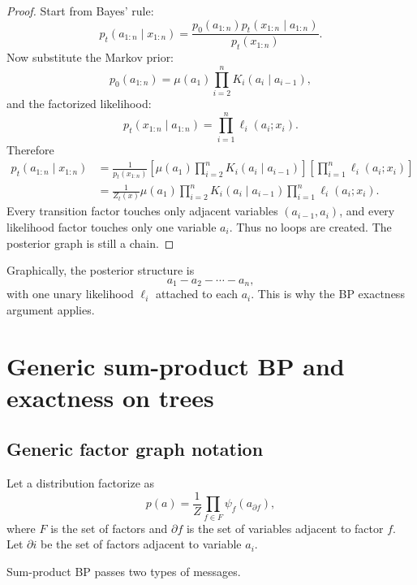 \documentclass[11pt]{article}
\begin{document}
\begin{proof}
Start from Bayes' rule:
\begin{equation}
  p_t(a_{1:n}\mid x_{1:n})
  = \frac{p_0(a_{1:n})p_t(x_{1:n}\mid a_{1:n})}{p_t(x_{1:n})}.
\end{equation}
Now substitute the Markov prior:
\begin{equation}
  p_0(a_{1:n}) = \mu(a_1)\prod_{i=2}^n K_i(a_i\mid a_{i-1}),
\end{equation}
and the factorized likelihood:
\begin{equation}
  p_t(x_{1:n}\mid a_{1:n}) = \prod_{i=1}^n \ell_i(a_i;x_i).
\end{equation}
Therefore
\begin{align}
  p_t(a_{1:n}\mid x_{1:n})
  &= \frac{1}{p_t(x_{1:n})}
  \left[\mu(a_1)\prod_{i=2}^n K_i(a_i\mid a_{i-1})\right]
  \left[\prod_{i=1}^n \ell_i(a_i;x_i)\right] \\
  &= \frac{1}{Z_t(x)}
  \mu(a_1)
  \prod_{i=2}^n K_i(a_i\mid a_{i-1})
  \prod_{i=1}^n \ell_i(a_i;x_i).
\end{align}
Every transition factor touches only adjacent variables \((a_{i-1},a_i)\), and every likelihood factor touches only one variable \(a_i\). Thus no loops are created. The posterior graph is still a chain.\end{proof}

Graphically, the posterior structure is
\[
  a_1 - a_2 - \cdots - a_n,
\]
with one unary likelihood \(\ell_i\) attached to each \(a_i\). This is why the BP exactness argument applies.

\section{Generic sum-product BP and exactness on trees}

\subsection{Generic factor graph notation}

Let a distribution factorize as
\begin{equation}
  p(a) = \frac{1}{Z}\prod_{f\in F}\psi_f(a_{\partial f}),
  \label{eq:generic-factorization}
\end{equation}
where \(F\) is the set of factors and \(\partial f\) is the set of variables adjacent to factor \(f\). Let \(\partial i\) be the set of factors adjacent to variable \(a_i\).

Sum-product BP passes two types of messages.
\end{document}
